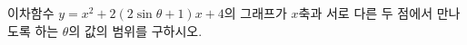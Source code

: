 이차함수 $y=x^2+2(2\sin\theta+1)x+4$의 그래프가 $x$축과 서로 다른 두 점에서 만나도록 하는 $\theta$의 값의 범위를 구하시오. \cond{$0\le\theta<2\pi$}
